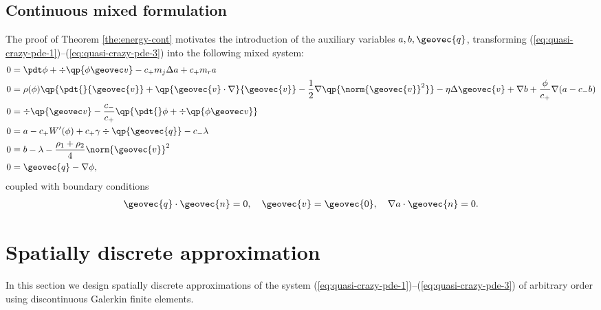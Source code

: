 \documentclass[final]{amsart}
\numberwithin{equation}{section}
\begin{document}
\subsection{Continuous mixed formulation}

The proof of Theorem \ref{the:energy-cont} motivates the introduction
of the auxiliary variables $a,b, \geovec{q}$, transforming
(\ref{eq:quasi-crazy-pde-1})--(\ref{eq:quasi-crazy-pde-3}) into the
following mixed system:
\begin{equation}
  \begin{split}
    0
    &= 
    \pdt \phi 
    +
    \div\qp{\phi\geovec v}
    -
    c_+ m_j \Delta a
    +
    c_+ m_r a
    \\
    0 
    &= 
    \rho(\phi)
    \qp{
      \pdt{} {\geovec{{v}}} 
      +
      \qp{{{\geovec{{v}}}}\cdot \nabla}{\geovec{{v}}}
      -
      \frac{1}{2}
      \nabla\qp{\norm{{\geovec{{v}}}}^2}
    }
    - 
    \eta \Delta \geovec{v}
    +
    \nabla b
    +
    \frac{\phi}{c_+}\nabla( a - {c_-} b)
    \\
    0 
    &= 
    \div\qp{\geovec v}
    -
    \frac{c_-}{c_+}
    \qp{
      \pdt{} \phi
      +
      \div\qp{\phi\geovec v}
    }
    \\
    0
    &=
    a
    - 
    c_+W'(\phi)
    +
    c_+\gamma\div\qp{{\geovec{{q}}}}
    -
    c_-\lambda
    \\
    0&= 
    b
    -
    \lambda
    -
    \frac{\rho_1+\rho_2}{4}
    \norm{\geovec{v}}^2
    \\
    0 
    &=
    \geovec{q} 
    -
    \nabla \phi,
  \end{split}
\end{equation}
coupled with boundary conditions
\begin{gather}
  \label{eq:mixed-bcs}
  {\geovec{q}} \cdot {\geovec{n}} = 0, \quad
  {\geovec{v}} = {\geovec{0}}, \quad
  \nabla a \cdot {\geovec{n}} = 0.
\end{gather}

\section{Spatially discrete approximation}
\label{sec:spatially-discrete}

In this section we design spatially discrete approximations of the
system (\ref{eq:quasi-crazy-pde-1})--(\ref{eq:quasi-crazy-pde-3}) of
arbitrary order using discontinuous Galerkin finite elements.
\end{document}
